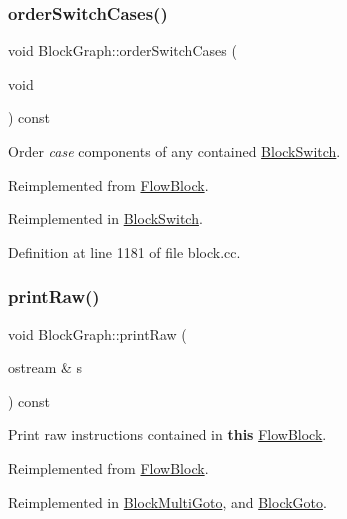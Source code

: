 \subsubsection{\texorpdfstring{orderSwitchCases()}{orderSwitchCases()}}
{\footnotesize\ttfamily void Block\+Graph\+::order\+Switch\+Cases (\begin{DoxyParamCaption}\item[{void}]{ }\end{DoxyParamCaption}) const\hspace{0.3cm}{\ttfamily [virtual]}}



Order {\itshape case} components of any contained \mbox{\hyperlink{class_block_switch}{Block\+Switch}}. 



Reimplemented from \mbox{\hyperlink{class_flow_block_abd18da44c1332bbb2e495fde85863eb5}{Flow\+Block}}.



Reimplemented in \mbox{\hyperlink{class_block_switch_a3413057234f7606357b6037a516627a6}{Block\+Switch}}.



Definition at line 1181 of file block.\+cc.

\mbox{\label{class_block_graph_abcae771fc675bcc52c78b2f1dc0ab98a}} 
\subsubsection{\texorpdfstring{printRaw()}{printRaw()}}
{\footnotesize\ttfamily void Block\+Graph\+::print\+Raw (\begin{DoxyParamCaption}\item[{ostream \&}]{s }\end{DoxyParamCaption}) const\hspace{0.3cm}{\ttfamily [virtual]}}



Print raw instructions contained in {\bfseries{this}} \mbox{\hyperlink{class_flow_block}{Flow\+Block}}. 



Reimplemented from \mbox{\hyperlink{class_flow_block_aa5bd09d25026872141e42118b03119b1}{Flow\+Block}}.



Reimplemented in \mbox{\hyperlink{class_block_multi_goto_a56b9c331488b4bf0c0f01cc583192630}{Block\+Multi\+Goto}}, and \mbox{\hyperlink{class_block_goto_aa665d1bc9ba041f0c90c52322abf5727}{Block\+Goto}}.




